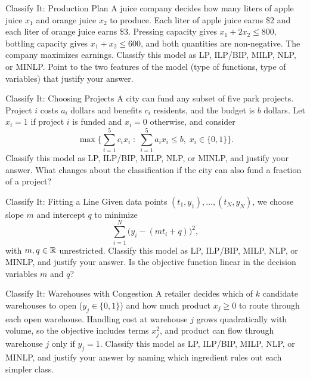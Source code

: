 
\begin{ex}{Classify It: Production Plan}{}
 A juice company decides how many liters of apple juice $x_1$ and orange juice $x_2$ to produce.  Each liter of apple juice earns \$2 and each liter of orange juice earns \$3.  Pressing capacity gives $x_1 + 2x_2 \leq 800$, bottling capacity gives $x_1 + x_2 \leq 600$, and both quantities are non-negative.  The company maximizes earnings.  Classify this model as LP, ILP/BIP, MILP, NLP, or MINLP.  Point to the two features of the model (type of functions, type of variables) that justify your answer.
\end{ex}

\begin{ex}{Classify It: Choosing Projects}{}
\label{ex:classify-projects}
 A city can fund any subset of five park projects.  Project $i$ costs $a_i$ dollars and benefits $c_i$ residents, and the budget is $b$ dollars.  Let $x_i = 1$ if project $i$ is funded and $x_i = 0$ otherwise, and consider
\[
\max \Big\{ \sum_{i=1}^5 c_i x_i \;:\; \sum_{i=1}^5 a_i x_i \leq b, \; x_i \in \{0,1\} \Big\}.
\]
Classify this model as LP, ILP/BIP, MILP, NLP, or MINLP, and justify your answer.  What changes about the classification if the city can also fund a fraction of a project?
\end{ex}

\begin{ex}{Classify It: Fitting a Line}{}
 Given data points $(t_1,y_1), \dots, (t_N,y_N)$, we choose slope $m$ and intercept $q$ to minimize
\[
\sum_{i=1}^N \big(y_i - (mt_i + q)\big)^2 ,
\]
with $m, q \in \mathbb{R}$ unrestricted.  Classify this model as LP, ILP/BIP, MILP, NLP, or MINLP, and justify your answer.  Is the objective function linear in the decision variables $m$ and $q$?
\end{ex}

\begin{ex}{Classify It: Warehouses with Congestion}{}
 A retailer decides which of $k$ candidate warehouses to open ($y_j \in \{0,1\}$) and how much product $x_j \geq 0$ to route through each open warehouse.  Handling cost at warehouse $j$ grows quadratically with volume, so the objective includes terms $x_j^2$, and product can flow through warehouse $j$ only if $y_j = 1$.  Classify this model as LP, ILP/BIP, MILP, NLP, or MINLP, and justify your answer by naming which ingredient rules out each simpler class.
\end{ex}

